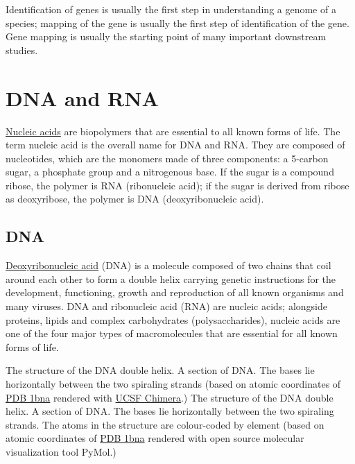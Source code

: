 Identification of genes is usually the first step in understanding a genome of a species; mapping of the gene is usually the first step of identification of the gene. Gene mapping is usually the starting point of many important downstream studies.

\hypertarget{dna-and-rna}{%
\chapter{DNA and RNA}\label{dna-and-rna}}

\href{https://en.wikipedia.org/wiki/Nucleic_acid}{Nucleic acids} are biopolymers that are essential to all known forms of life. The term nucleic acid is the overall name for DNA and RNA. They are composed of nucleotides, which are the monomers made of three components: a 5-carbon sugar, a phosphate group and a nitrogenous base. If the sugar is a compound ribose, the polymer is RNA (ribonucleic acid); if the sugar is derived from ribose as deoxyribose, the polymer is DNA (deoxyribonucleic acid).

\hypertarget{dna}{%
\section{DNA}\label{dna}}

\href{https://en.wikipedia.org/wiki/DNA}{Deoxyribonucleic acid} (DNA) is a molecule composed of two chains that coil around each other to form a double helix carrying genetic instructions for the development, functioning, growth and reproduction of all known organisms and many viruses. DNA and ribonucleic acid (RNA) are nucleic acids; alongside proteins, lipids and complex carbohydrates (polysaccharides), nucleic acids are one of the four major types of macromolecules that are essential for all known forms of life.

The structure of the DNA double helix. A section of DNA. The bases lie horizontally between the two spiraling strands (based on atomic coordinates of \href{https://www.rcsb.org/structure/1bna}{PDB 1bna} rendered with \href{https://www.cgl.ucsf.edu/chimera/}{UCSF Chimera}.) The structure of the DNA double helix. A section of DNA. The bases lie horizontally between the two spiraling strands. The atoms in the structure are colour-coded by element (based on atomic coordinates of \href{https://www.rcsb.org/structure/1bna}{PDB 1bna} rendered with open source molecular visualization tool PyMol.)

